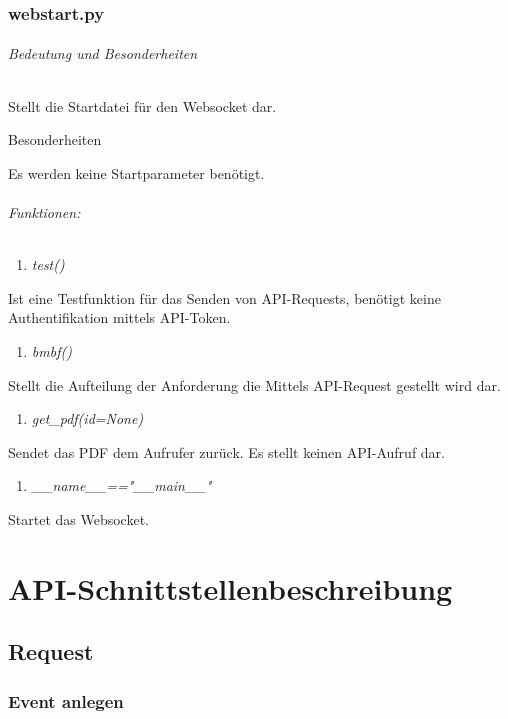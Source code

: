 \documentclass[12pt,parskip=full, pagea4]{scrreprt}
\begin{document}
			\leftskip=0cm
						
			\section{webstart.py}
			\paragraph{Bedeutung und Besonderheiten}Stellt die Startdatei f\"ur den Websocket dar.
			\subparagraph{Besonderheiten}Es werden keine Startparameter ben\"otigt.
			\paragraph{Funktionen:}
			\begin{enumerate}
				\item \textit{test()}
			\end{enumerate}
			\leftskip=1.5cm	Ist eine Testfunktion f\"ur das Senden von API-Requests, ben\"otigt keine Authentifikation mittels API-Token.
			\begin{enumerate}[resume]
				\item \textit{bmbf()}
			\end{enumerate}
			\leftskip=1.5cm Stellt die Aufteilung der Anforderung die Mittels API-Request gestellt wird dar.
			\begin{enumerate}[resume]
				\item \textit{get\_pdf(id=None)}
			\end{enumerate}
			\leftskip=1.5cm	Sendet das PDF dem Aufrufer zurück. Es stellt keinen API-Aufruf dar.
			\begin{enumerate}[resume]
				\item \textit{\_\_name\_\_=="\_\_main\_\_"}	
			\end{enumerate}
			\leftskip=1.5cm	Startet das Websocket.
			
			\leftskip=0cm
								
\makeatletter
{}
\makeatother   
    	
    \part{API-Schnittstellenbeschreibung}
    	\chapter{Request}
    		\section{Event anlegen}
\end{document}
